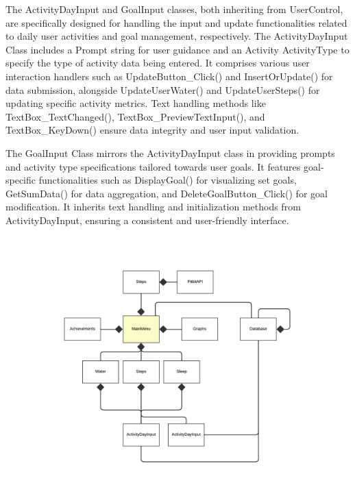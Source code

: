 \documentclass[12pt]{article}
\begin{document}
The ActivityDayInput and GoalInput classes, both inheriting from UserControl, are specifically designed for handling the input and update functionalities related to daily user activities and goal management, respectively. The ActivityDayInput Class includes a Prompt string for user guidance and an Activity ActivityType to specify the type of activity data being entered. It comprises various user interaction handlers such as UpdateButton_Click() and InsertOrUpdate() for data submission, alongside UpdateUserWater() and UpdateUserSteps() for updating specific activity metrics. Text handling methods like TextBox_TextChanged(), TextBox_PreviewTextInput(), and TextBox_KeyDown() ensure data integrity and user input validation.\par

The GoalInput Class mirrors the ActivityDayInput class in providing prompts and activity type specifications tailored towards user goals. It features goal-specific functionalities such as DisplayGoal() for visualizing set goals, GetSumData() for data aggregation, and DeleteGoalButton_Click() for goal modification. It inherits text handling and initialization methods from ActivityDayInput, ensuring a consistent and user-friendly interface.\par

\begin{figure}[h]
\centering
\includegraphics{UML Flow diagram}
\end{figure}
\end{document}
